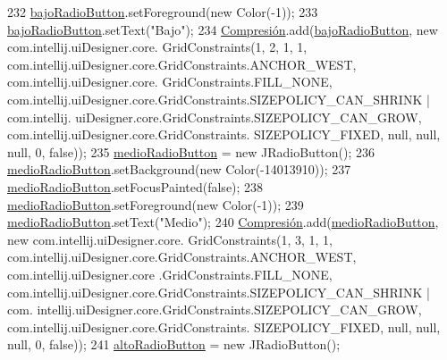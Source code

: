 \begin{DoxyCode}
232         \hyperlink{classpresentacion_1_1form_1_1PopUp__Comp_add9532658d448dcbfa9b7dd40ddc8b38}{bajoRadioButton}.setForeground(\textcolor{keyword}{new} Color(-1));
233         \hyperlink{classpresentacion_1_1form_1_1PopUp__Comp_add9532658d448dcbfa9b7dd40ddc8b38}{bajoRadioButton}.setText(\textcolor{stringliteral}{"Bajo"});
234         \hyperlink{classpresentacion_1_1form_1_1PopUp__Comp_a5769b499f21466bae765c41428512966}{Compresión}.add(\hyperlink{classpresentacion_1_1form_1_1PopUp__Comp_add9532658d448dcbfa9b7dd40ddc8b38}{bajoRadioButton}, \textcolor{keyword}{new} com.intellij.uiDesigner.core.
      GridConstraints(1, 2, 1, 1, com.intellij.uiDesigner.core.GridConstraints.ANCHOR\_WEST, com.intellij.uiDesigner.core.
      GridConstraints.FILL\_NONE, com.intellij.uiDesigner.core.GridConstraints.SIZEPOLICY\_CAN\_SHRINK | com.intellij.
      uiDesigner.core.GridConstraints.SIZEPOLICY\_CAN\_GROW, com.intellij.uiDesigner.core.GridConstraints.
      SIZEPOLICY\_FIXED, null, null, null, 0, \textcolor{keyword}{false}));
235         \hyperlink{classpresentacion_1_1form_1_1PopUp__Comp_ad1daa09264648f37642b24a698e32206}{medioRadioButton} = \textcolor{keyword}{new} JRadioButton();
236         \hyperlink{classpresentacion_1_1form_1_1PopUp__Comp_ad1daa09264648f37642b24a698e32206}{medioRadioButton}.setBackground(\textcolor{keyword}{new} Color(-14013910));
237         \hyperlink{classpresentacion_1_1form_1_1PopUp__Comp_ad1daa09264648f37642b24a698e32206}{medioRadioButton}.setFocusPainted(\textcolor{keyword}{false});
238         \hyperlink{classpresentacion_1_1form_1_1PopUp__Comp_ad1daa09264648f37642b24a698e32206}{medioRadioButton}.setForeground(\textcolor{keyword}{new} Color(-1));
239         \hyperlink{classpresentacion_1_1form_1_1PopUp__Comp_ad1daa09264648f37642b24a698e32206}{medioRadioButton}.setText(\textcolor{stringliteral}{"Medio"});
240         \hyperlink{classpresentacion_1_1form_1_1PopUp__Comp_a5769b499f21466bae765c41428512966}{Compresión}.add(\hyperlink{classpresentacion_1_1form_1_1PopUp__Comp_ad1daa09264648f37642b24a698e32206}{medioRadioButton}, \textcolor{keyword}{new} com.intellij.uiDesigner.core.
      GridConstraints(1, 3, 1, 1, com.intellij.uiDesigner.core.GridConstraints.ANCHOR\_WEST, com.intellij.uiDesigner.core
      .GridConstraints.FILL\_NONE, com.intellij.uiDesigner.core.GridConstraints.SIZEPOLICY\_CAN\_SHRINK | com.
      intellij.uiDesigner.core.GridConstraints.SIZEPOLICY\_CAN\_GROW, com.intellij.uiDesigner.core.GridConstraints.
      SIZEPOLICY\_FIXED, null, null, null, 0, \textcolor{keyword}{false}));
241         \hyperlink{classpresentacion_1_1form_1_1PopUp__Comp_a9f49f4c6ce6d4f60a7015d8699aef151}{altoRadioButton} = \textcolor{keyword}{new} JRadioButton();

\end{DoxyCode}
